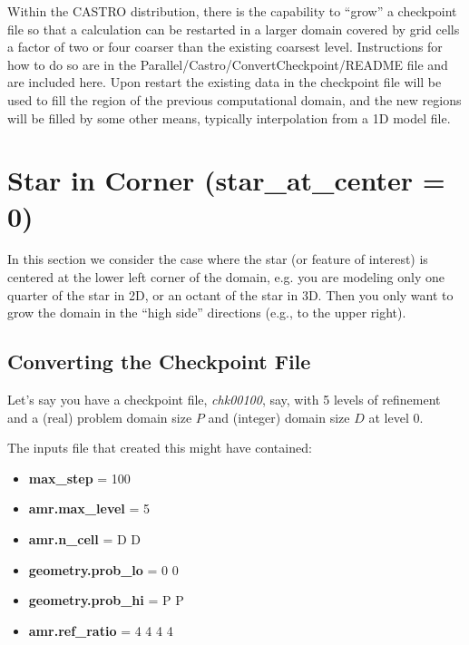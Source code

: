 
Within the CASTRO distribution, there is the capability to ``grow'' a checkpoint file so 
that a calculation can be restarted in a larger domain covered by grid cells a factor of
two or four coarser than the existing coarsest level.  Instructions for how to
do so are in the Parallel/Castro/ConvertCheckpoint/README file and are included here.
Upon restart the existing data in the checkpoint file will be used to fill the region of the previous 
computational domain, and the new regions will be filled by some other means, typically
interpolation from a 1D model file.

\section{Star in Corner ({\bf star\_at\_center = 0}) }

In this section we consider the case where the star (or feature of interest) 
is centered at the lower left corner of the domain, e.g. you are modeling only one 
quarter of the star in 2D, or an octant of the star in 3D.  Then you only want
to grow the domain in the ``high side'' directions (e.g., to the upper right).

\subsection{Converting the Checkpoint File}

Let's say you have a checkpoint file, {\em chk00100},  say, with 5 levels of refinement 
and a (real) problem domain size $P$ and (integer) domain size $D$ at level 0.  

The inputs file that created this might have contained:

\begin{itemize}

\item {\bf max\_step}      = 100

\item {\bf amr.max\_level} = 5

\item {\bf amr.n\_cell}    = D D

\item {\bf geometry.prob\_lo} = 0 0

\item {\bf geometry.prob\_hi} = P P

\item {\bf amr.ref\_ratio}    = 4 4 4 4

\end{itemize}

